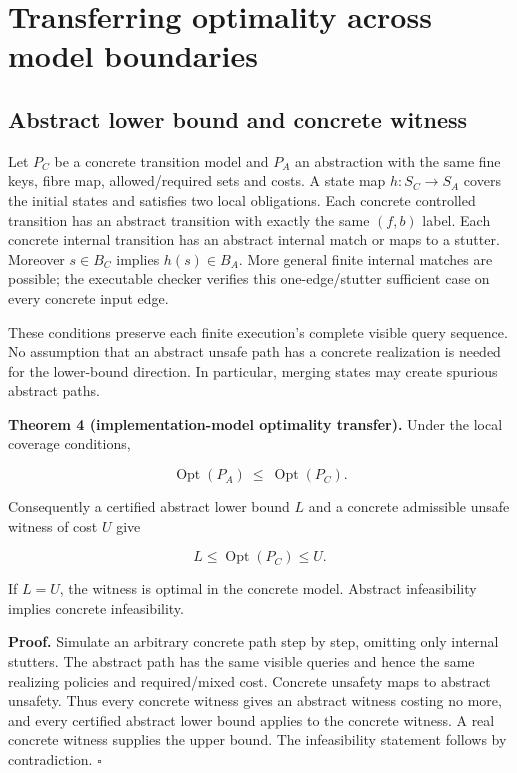 \section{Transferring optimality across model
boundaries}\label{transferring-optimality-across-model-boundaries}

\subsection{Abstract lower bound and concrete
witness}\label{abstract-lower-bound-and-concrete-witness}

Let \(P_C\) be a concrete transition model and \(P_A\) an abstraction
with the same fine keys, fibre map, allowed/required sets and costs. A
state map \(h:S_C\to S_A\) covers the initial states and satisfies two
local obligations. Each concrete controlled transition has an abstract
transition with exactly the same \((f,b)\) label. Each concrete internal
transition has an abstract internal match or maps to a stutter. Moreover
\(s\in B_C\) implies \(h(s)\in B_A\). More general finite internal
matches are possible; the executable checker verifies this
one-edge/stutter sufficient case on every concrete input edge.

These conditions preserve each finite execution's complete visible query
sequence. No assumption that an abstract unsafe path has a concrete
realization is needed for the lower-bound direction. In particular,
merging states may create spurious abstract paths.

\textbf{Theorem 4 (implementation-model optimality transfer).} Under the
local coverage conditions,

\[
\operatorname{Opt}(P_A)\ \le\ \operatorname{Opt}(P_C).
\]

Consequently a certified abstract lower bound \(L\) and a concrete
admissible unsafe witness of cost \(U\) give

\[
\boxed{L\le\operatorname{Opt}(P_C)\le U.}
\]

If \(L=U\), the witness is optimal in the concrete model. Abstract
infeasibility implies concrete infeasibility.

\textbf{Proof.} Simulate an arbitrary concrete path step by step,
omitting only internal stutters. The abstract path has the same visible
queries and hence the same realizing policies and required/mixed cost.
Concrete unsafety maps to abstract unsafety. Thus every concrete witness
gives an abstract witness costing no more, and every certified abstract
lower bound applies to the concrete witness. A real concrete witness
supplies the upper bound. The infeasibility statement follows by
contradiction. \(\square\)

